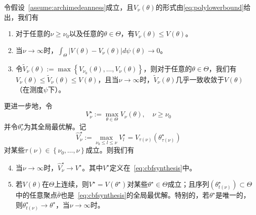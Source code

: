 \begin{theorem}
    \label{thm:globalconvergence}
    令假设~\ref{assume:archimedeanness}成立，且$V_\nu (\theta)$的形式由\eqref{eq:polylowerbound}给出，我们有
    \begin{enumerate}
        \item 对于任意的$\nu \ge \nu_0$以及任意的$\theta \in \Theta$，有$V_\nu(\theta) \le V(\theta)$。
        \item 当$\nu \rightarrow \infty$时，$\int_\Theta | V(\theta) - V_\nu(\theta) | d \psi(\theta) \rightarrow 0$。
        \item 令$\tilde{V}_\nu(\theta) := \max\left\{ V_{\nu_0}(\theta), \dots, V_\nu(\theta) \right\}$，则对于任意的$\theta \in \Theta$，我们有$V_\nu(\theta) \le \tilde{V}_\nu(\theta) \le V(\theta)$，且当$\nu \rightarrow \infty$时，$\tilde{V}_\nu(\theta)$几乎一致收敛于$V(\theta)$（在测度$\psi$下）。
    \end{enumerate}
    更进一步地，令
    \begin{equation}\label{eq:maxlowerbound}
        V_\nu^\star := \max_{\theta \in \Theta} V_\nu(\theta), \quad \nu \ge \nu_0
    \end{equation}
    并令$\theta_\nu^\star$为其全局最优解。记
    \begin{equation}\label{eq:bestmaximizer}
        \hat{V}_\nu^\star := \max_{\nu_0 \le l \le \nu} V_l^\star = V_{\tau(\nu)}(\theta_{\tau(\nu)}^\star)
    \end{equation}
    对某些$\tau(\nu) \in \left\{ \nu_0, \dots, \nu \right\}$成立。则我们有
    \begin{enumerate}
        \setcounter{enumi}{3}
        \item 当$\nu \rightarrow \infty$时，$\hat{V}_\nu^\star \rightarrow V^\star$。其中$V^\star$定义在~\eqref{eq:cbfsynthesis}中。
        \item 若$V(\theta)$在$\Theta$上连续，则$V^\star = V(\theta^\star)$对某些$\theta^\star \in \Theta$成立；且序列$(\theta_{t(\nu)}^\star) \subset \Theta$中的任意聚点$\bar{\theta}$也是~\eqref{eq:cbfsynthesis}的全局最优解。特别的，若$\theta^\star$是唯一的，则$\theta_{t(\nu)}^\star \rightarrow \theta^\star$，当$\nu \rightarrow \infty$时。
    \end{enumerate}
\end{theorem}

